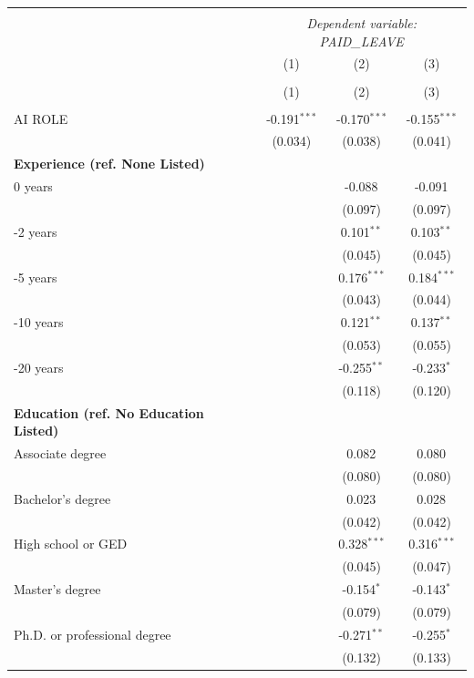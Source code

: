 \begin{table}[!htbp] \centering
\begin{tabular}{@{\extracolsep{5pt}}lccc}
\\[-1.8ex]\hline
\hline \\[-1.8ex]
& \multicolumn{3}{c}{\textit{Dependent variable: PAID_LEAVE}} \
\cr \cline{2-4}
\\[-1.8ex] & \multicolumn{1}{c}{(1)} & \multicolumn{1}{c}{(2)} & \multicolumn{1}{c}{(3)}  \\
\\[-1.8ex] & (1) & (2) & (3) \\
\hline \\[-1.8ex]
 AI ROLE & -0.191$^{***}$ & -0.170$^{***}$ & -0.155$^{***}$ \\
& (0.034) & (0.038) & (0.041) \\
 \textbf{Experience (ref. None Listed)}\\
0 years & & -0.088$^{}$ & -0.091$^{}$ \\
& & (0.097) & (0.097) \\
 \quad 1-2 years & & 0.101$^{**}$ & 0.103$^{**}$ \\
& & (0.045) & (0.045) \\
 \quad 3-5 years & & 0.176$^{***}$ & 0.184$^{***}$ \\
& & (0.043) & (0.044) \\
 \quad 6-10 years & & 0.121$^{**}$ & 0.137$^{**}$ \\
& & (0.053) & (0.055) \\
 \quad 11-20 years & & -0.255$^{**}$ & -0.233$^{*}$ \\
& & (0.118) & (0.120) \\
 \textbf{Education (ref. No Education Listed)}\\
Associate degree & & 0.082$^{}$ & 0.080$^{}$ \\
& & (0.080) & (0.080) \\
 \quad Bachelor's degree & & 0.023$^{}$ & 0.028$^{}$ \\
& & (0.042) & (0.042) \\
 \quad High school or GED & & 0.328$^{***}$ & 0.316$^{***}$ \\
& & (0.045) & (0.047) \\
 \quad Master's degree & & -0.154$^{*}$ & -0.143$^{*}$ \\
& & (0.079) & (0.079) \\
 \quad Ph.D. or professional degree & & -0.271$^{**}$ & -0.255$^{*}$ \\
& & (0.132) & (0.133) \\

\end{tabular}
\end{table}
